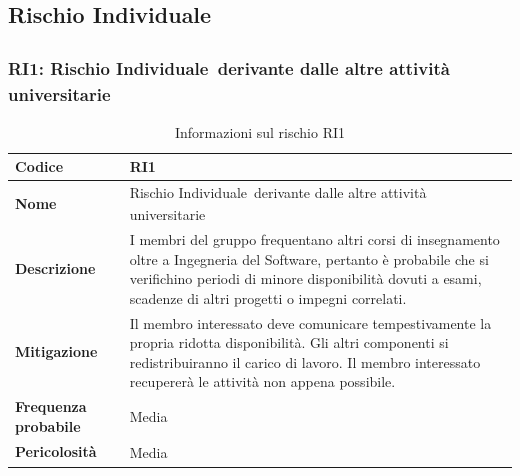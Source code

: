 \documentclass[a4paper,12pt]{article}
\newcommand{\pediceG}{\texorpdfstring{\textsubscript{\scalebox{0.6}{\textbf{G}}}~}{G}}
\begin{document}
\newpage
\subsection{Rischio Individuale\pediceG}

\subsubsection{RI1: Rischio Individuale\pediceG derivante dalle altre attività universitarie}
\begin{table}[H]
\centering
\begin{tabular}{|>{\raggedright\arraybackslash}p{4cm}|>{\raggedright\arraybackslash}p{10cm}|}
\hline
\textbf{Codice} & RI1 \\
\hline
\textbf{Nome} & Rischio Individuale\pediceG derivante dalle altre attività universitarie \\
\hline
\textbf{Descrizione} & I membri del gruppo frequentano altri corsi di insegnamento oltre a Ingegneria del Software, pertanto è probabile che si verifichino periodi di minore disponibilità dovuti a esami, scadenze di altri progetti o impegni correlati. \\
\hline
\textbf{Mitigazione\pediceG} & Il membro interessato deve comunicare tempestivamente la propria ridotta disponibilità. Gli altri componenti si redistribuiranno il carico di lavoro. Il membro interessato recupererà le attività non appena possibile. \\
\hline
\textbf{Frequenza probabile} & Media \\
\hline
\textbf{Pericolosità\pediceG} & Media \\
\hline
\end{tabular}
\caption{Informazioni sul rischio RI1}
\label{tab:ri1}
\end{table}
\end{document}
